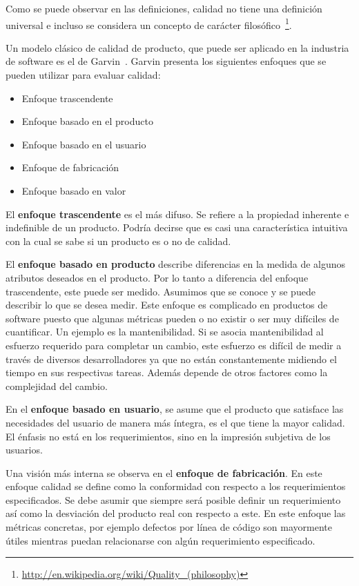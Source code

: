 Como se puede observar en las definiciones, calidad no tiene una definición universal e incluso se considera
un concepto de carácter filosófico~\footnote{\url{http://en.wikipedia.org/wiki/Quality_(philosophy)}}.

Un modelo clásico de calidad de producto, que puede ser aplicado en la industria
de software es el de Garvin~\cite{Garvin:1984}. Garvin presenta los siguientes
enfoques que se pueden utilizar para evaluar calidad:
\begin{itemize}
    \item Enfoque trascendente
    \item Enfoque basado en el producto
    \item Enfoque basado en el usuario
    \item Enfoque de fabricación
    \item Enfoque basado en valor
\end{itemize}

El \textbf{enfoque trascendente} es el más difuso. Se refiere a la propiedad inherente
e indefinible de un producto. Podría decirse que es casi una característica 
intuitiva con la cual se sabe si un producto es o no de calidad.

El \textbf{enfoque basado en producto} describe diferencias en la medida de algunos
atributos deseados en el producto. Por lo tanto a diferencia del enfoque
trascendente, este puede ser medido. Asumimos que se conoce y se puede
describir lo que se desea medir.
Este enfoque es complicado en productos de software puesto que algunas métricas
pueden o no existir o ser muy difíciles de cuantificar. Un ejemplo es la mantenibilidad.
Si se asocia mantenibilidad al esfuerzo requerido para completar un cambio, este
esfuerzo es difícil de medir a través de diversos desarrolladores ya que no están
constantemente midiendo el tiempo en sus respectivas tareas. Además depende de
otros factores como la complejidad del cambio.

En el \textbf{enfoque basado en usuario}, se asume que el producto que satisface
las necesidades del usuario de manera más íntegra, es el que tiene la mayor calidad. El énfasis
no está en los requerimientos, sino en la impresión subjetiva de los usuarios.

Una visión más interna se observa en el \textbf{enfoque de fabricación}. En este enfoque
calidad se define como la conformidad con respecto a los requerimientos especificados.
Se debe asumir que siempre será posible definir un requerimiento así como la desviación
del producto real con respecto a este. En este enfoque las métricas
concretas, por ejemplo defectos por línea de código son mayormente útiles mientras puedan
relacionarse con algún requerimiento especificado.

